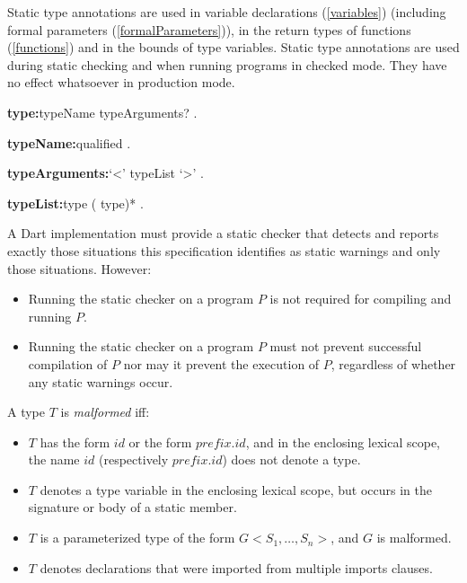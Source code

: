 \documentclass{article}
\begin{document}
\LMHash{}
Static type annotations are used in variable declarations (\ref{variables}) (including formal parameters (\ref{formalParameters})), in the return types of functions (\ref{functions}) and in the bounds of type variables.
Static type annotations are used during static checking and when running programs in checked mode.
They have no effect whatsoever in production mode.

\begin{grammar}
{\bf type:}typeName typeArguments?
  .

{\bf typeName:}qualified
  .

{\bf typeArguments:}`<' typeList `>'
  .

{\bf typeList:}type (\gcomma{} type)*
  .
\end{grammar}

\LMHash{}
A Dart implementation must provide a static checker that detects and reports exactly those situations this specification identifies as static warnings and only those situations.
However:
\begin{itemize}
\item Running the static checker on a program $P$ is not required for compiling and running $P$.
\item Running the static checker on a program $P$ must not prevent successful compilation of $P$ nor may it prevent the execution of $P$, regardless of whether any static warnings occur.
\end{itemize}


\LMHash{}
A type $T$ is {\em malformed} if{}f:
\begin{itemize}
\item $T$ has the form $id$ or the form $prefix.id$, and in the enclosing lexical scope, the name $id$ (respectively $prefix.id$) does not denote a type.
\item $T$ denotes a type variable in the enclosing lexical scope, but occurs in the signature or body of a static member.
\item $T$ is a parameterized type of the form $G<S_1, \ldots , S_n>$, and $G$ is malformed.
\item $T$ denotes declarations that were imported from multiple imports clauses.
\end{itemize}
\end{document}
